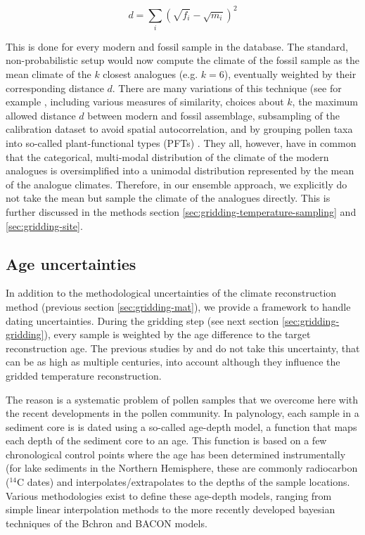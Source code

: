 \begin{refsection}
\begin{equation*}
d = \sum_{i}\left(\sqrt{f_{i}} - \sqrt{m_{i}}\right)^2
\end{equation*}

This is done for every modern and fossil sample in the database. The standard, non-probabilistic setup would now compute the climate of the fossil sample as the mean climate of the $k$ closest analogues (e.g. $k = 6$), eventually weighted by their corresponding distance $d$. There are many variations of this technique (see for example \cite{BirksHeiriSeppaeEtAl2010}, including various measures of similarity\addref, choices about $k$\addref, the maximum allowed distance $d$ between modern and fossil assemblage\addref, subsampling of the calibration dataset to avoid spatial autocorrelation, and by grouping pollen taxa into so-called plant-functional types (PFTs) \citep[e.g.]{DavisBrewerStevensonEtAl2003, MauriDavisCollinsEtAl2015}. They all, however, have in common that the categorical, multi-modal distribution of the climate of the modern analogues is oversimplified into a unimodal distribution represented by the mean of the analogue climates. Therefore, in our ensemble approach, we explicitly do not take the mean but sample the climate of the analogues directly. This is further discussed in the methods section \ref{sec:gridding-temperature-sampling} and \ref{sec:gridding-site}.


\subsection{Age uncertainties}  \label{sec:gridding-ageunc}
In addition to the methodological uncertainties of the climate reconstruction method (previous section \ref{sec:gridding-mat}), we provide a framework to handle dating uncertainties. During the gridding step (see next section \ref{sec:gridding-gridding}), every sample is weighted by the age difference to the target reconstruction age. The previous studies by \cite{DavisBrewerStevensonEtAl2003} and \cite{MauriDavisCollinsEtAl2015} do not take this uncertainty, that can be as high as multiple centuries, into account although they influence the gridded temperature reconstruction.

The reason is a systematic problem of pollen samples that we overcome here with the recent developments in the pollen community. In palynology, each sample in a sediment core is is dated using a so-called age-depth model, a function that maps each depth of the sediment core to an age. This function is based on a few chronological control points where the age has been determined instrumentally (for lake sediments in the Northern Hemisphere, these are commonly radiocarbon ($^{14}$C dates) and interpolates/extrapolates to the depths of the sample locations. Various methodologies exist to define these age-depth models, ranging from simple linear interpolation methods \citep{Bennett1994} to the more recently developed bayesian techniques of the Bchron \citep{HaslettParnell2008} and BACON \citep{BlaauwChristen2011} models.


\end{refsection}
